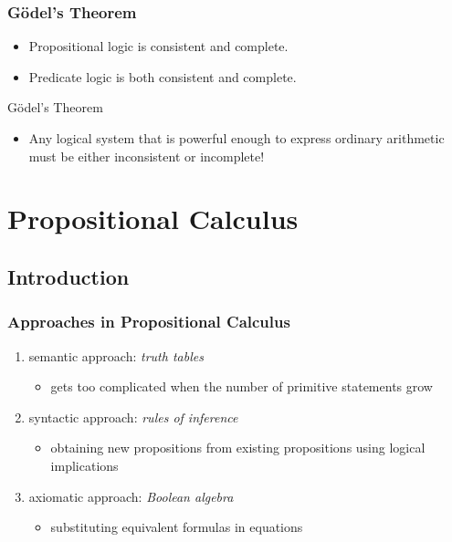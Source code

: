 \documentclass[dvipsnames]{beamer}
\begin{document}
\begin{frame}
  \frametitle{Gödel's Theorem}

  \begin{itemize}
    \item Propositional logic is consistent and complete.
    \item Predicate logic is both consistent and complete.
  \end{itemize}

  \pause
  \begin{block}{Gödel's Theorem}
    \begin{itemize}
      \item Any logical system that is powerful enough to express ordinary
        arithmetic must be either inconsistent or incomplete!
    \end{itemize}
  \end{block}
\end{frame}

\section{Propositional Calculus}

\subsection{Introduction}

\begin{frame}
  \frametitle{Approaches in Propositional Calculus}

  \begin{enumerate}
    \item semantic approach: \emph{truth tables}
    \begin{itemize}
      \item gets too complicated when the number of primitive statements grow
    \end{itemize}

    \pause
    \item syntactic approach: \emph{rules of inference}
    \begin{itemize}
      \item obtaining new propositions from existing propositions using logical
        implications
    \end{itemize}

    \pause
    \item axiomatic approach: \emph{Boolean algebra}
    \begin{itemize}
      \item substituting equivalent formulas in equations
    \end{itemize}
  \end{enumerate}
\end{frame}
\end{document}
